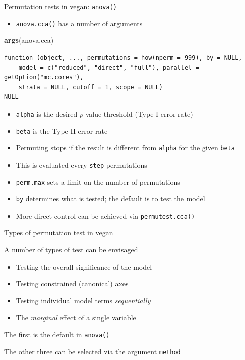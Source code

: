 \documentclass[10pt,ignorenonframetext,compress, aspectratio=169]{beamer}
\newenvironment{Shaded}{\begin{snugshade}}{\end{snugshade}}
\newcommand{\KeywordTok}[1]{\textcolor[rgb]{0.13,0.29,0.53}{\textbf{{#1}}}}
\newcommand{\NormalTok}[1]{{#1}}
\begin{document}
\begin{frame}[fragile]{Permutation tests in vegan: \texttt{anova()}}

\begin{itemize}
\itemsep1pt\parskip0pt
\item
  \texttt{anova.cca()} has a number of arguments
\end{itemize}

\tiny

\begin{Shaded}
\begin{Highlighting}[]
\KeywordTok{args}\NormalTok{(anova.cca)}
\end{Highlighting}
\end{Shaded}

\begin{verbatim}
function (object, ..., permutations = how(nperm = 999), by = NULL, 
    model = c("reduced", "direct", "full"), parallel = getOption("mc.cores"), 
    strata = NULL, cutoff = 1, scope = NULL) 
NULL
\end{verbatim}

\normalsize

\begin{itemize}
\itemsep1pt\parskip0pt
\item
  \texttt{alpha} is the desired $p$ value threshold (Type I error rate)
\item
  \texttt{beta} is the Type II error rate
\item
  Permuting stops if the result is different from \texttt{alpha} for the
  given \texttt{beta}
\item
  This is evaluated every \texttt{step} permutations
\item
  \texttt{perm.max} sets a limit on the number of permutations
\item
  \texttt{by} determines what is tested; the default is to test the
  model
\item
  More direct control can be achieved via \texttt{permutest.cca()}
\end{itemize}

\end{frame}

\begin{frame}{Types of permutation test in vegan}

A number of types of test can be envisaged

\begin{itemize}
\itemsep1pt\parskip0pt
\item
  Testing the overall significance of the model
\item
  Testing constrained (canonical) axes
\item
  Testing individual model terms \emph{sequentially}
\item
  The \emph{marginal} effect of a single variable
\end{itemize}

The first is the default in \texttt{anova()}

The other three can be selected via the argument \texttt{method}

\end{frame}
\end{document}
